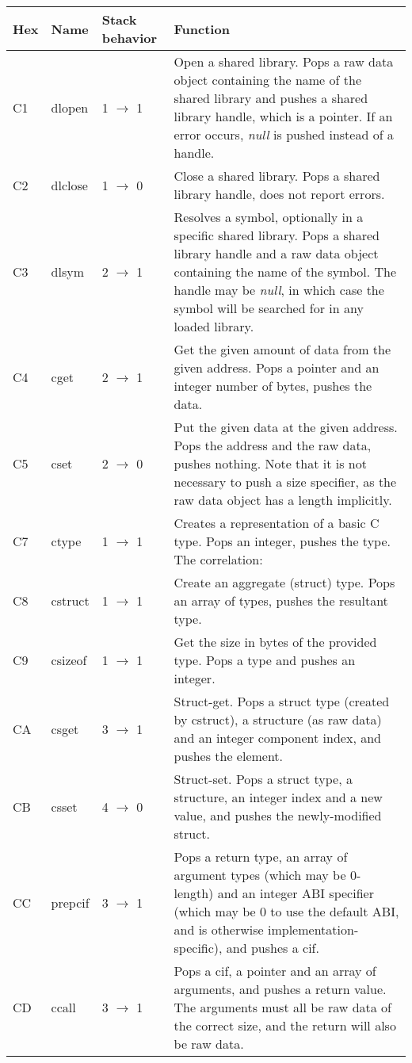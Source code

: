 \begin{longtable}{ | l | l | l | X | }
\hline
\textbf{Hex} & \textbf{Name} & \textbf{Stack behavior} & \textbf{Function} \\
\hline\hline
C1 & dlopen & 1 $\rightarrow$ 1 & Open a shared library. Pops a raw data object containing the name of the shared library and pushes a shared library handle, which is a pointer. If an error occurs, \textit{null} is pushed instead of a handle. \\
\hline
C2 & dlclose & 1 $\rightarrow$ 0 & Close a shared library. Pops a shared library handle, does not report errors. \\
\hline
C3 & dlsym & 2 $\rightarrow$ 1 & Resolves a symbol, optionally in a specific shared library. Pops a shared library handle and a raw data object containing the name of the symbol. The handle may be \textit{null}, in which case the symbol will be searched for in any loaded library. \\
\hline
C4 & cget & 2 $\rightarrow$ 1 & Get the given amount of data from the given address. Pops a pointer and an integer number of bytes, pushes the data. \\
\hline
C5 & cset & 2 $\rightarrow$ 0 & Put the given data at the given address. Pops the address and the raw data, pushes nothing. Note that it is not necessary to push a size specifier, as the raw data object has a length implicitly. \\
\hline
C7 & ctype & 1 $\rightarrow$ 1 &
Creates a representation of a basic C type. Pops an integer, pushes the type. The correlation: \\
\hline
C8 & cstruct & 1 $\rightarrow$ 1 & Create an aggregate (struct) type. Pops an array of types, pushes the resultant type. \\
\hline
C9 & csizeof & 1 $\rightarrow$ 1 & Get the size in bytes of the provided type. Pops a type and pushes an integer. \\
\hline
CA & csget & 3 $\rightarrow$ 1 & Struct-get. Pops a struct type (created by cstruct), a structure (as raw data) and an integer component index, and pushes the element. \\
\hline
CB & csset & 4 $\rightarrow$ 0 & Struct-set. Pops a struct type, a structure, an integer index and a new value, and pushes the newly-modified struct. \\
\hline
CC & prepcif & 3 $\rightarrow$ 1 & Pops a return type, an array of argument types (which may be 0-length) and an integer ABI specifier (which may be 0 to use the default ABI, and is otherwise implementation-specific), and pushes a cif. \\
\hline
CD & ccall & 3 $\rightarrow$ 1 & Pops a cif, a pointer and an array of arguments, and pushes a return value. The arguments must all be raw data of the correct size, and the return will also be raw data. \\
\hline
\end{longtable}

